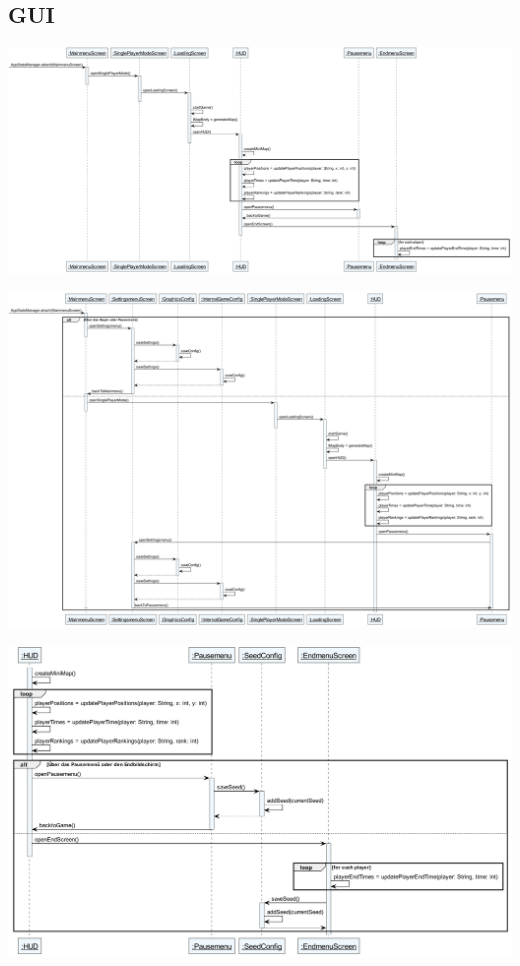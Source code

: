 \subsection{GUI}

\begin{center}

    \includegraphics[width=\linewidth]{./GUI/GUI_Bilder/AllScreens.png}
    \label{fig:AllScreens}

    \includegraphics[width=\linewidth]{./GUI/GUI_Bilder/EditSettings.png}
    \label{fig:EditSettings}

    \includegraphics[width=\linewidth]{./GUI/GUI_Bilder/SaveSeed.png}
    \label{fig:SaveSeed}

\end{center}

